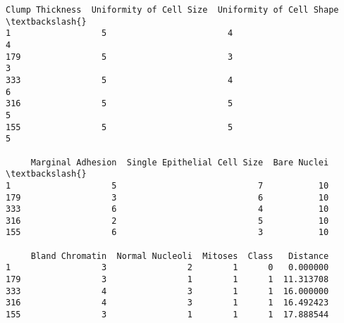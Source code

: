 \documentclass[11pt]{article}
\begin{document}
    \begin{Verbatim}[commandchars=\\\{\}]
     Clump Thickness  Uniformity of Cell Size  Uniformity of Cell Shape  \textbackslash{}
1                  5                        4                         4   
179                5                        3                         3   
333                5                        4                         6   
316                5                        5                         5   
155                5                        5                         5   

     Marginal Adhesion  Single Epithelial Cell Size  Bare Nuclei  \textbackslash{}
1                    5                            7           10   
179                  3                            6           10   
333                  6                            4           10   
316                  2                            5           10   
155                  6                            3           10   

     Bland Chromatin  Normal Nucleoli  Mitoses  Class   Distance  
1                  3                2        1      0   0.000000  
179                3                1        1      1  11.313708  
333                4                3        1      1  16.000000  
316                4                3        1      1  16.492423  
155                3                1        1      1  17.888544  

    \end{Verbatim}
\end{document}
